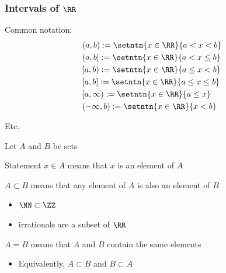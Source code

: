 \begin{frame}
    \frametitle{Intervals of $\RR$}

    Common notation:
    \begin{align*}
        & (a, b)  := \setntn{x \in \RR}{a < x < b}
        \\
        & (a, b]  := \setntn{x \in \RR}{a < x \leq b}
        \\
        & [a, b)  := \setntn{x \in \RR}{a \leq x < b}
        \\
        & [a, b]  := \setntn{x \in \RR}{a \leq x \leq b}
        \\
        & [a, \infty) := \setntn{x \in \RR}{a \leq x }
        \\
        & (-\infty, b) := \setntn{x \in \RR}{ x < b }
    \end{align*}

    Etc.

\end{frame}




\begin{frame}

    Let $A$ and $B$ be sets
    
    Statement $x \in A$ means that $x$ is an element of $A$
    
    $A \subset B$ means that any element of $A$ is also an element of $B$

    \Egs

    \begin{itemize}
        \item $\NN \subset \ZZ$
        \item irrationals are a subset of $\RR$
    \end{itemize}

    \vspace{1em}
    
    $A = B$ means that $A$ and $B$ contain the same elements 
    

    \begin{itemize}
        \item Equivalently, $A \subset B$ and $B \subset A$
    \end{itemize}

\end{frame}




